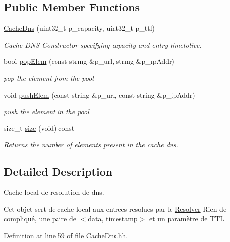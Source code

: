 \subsection*{Public Member Functions}
\begin{DoxyCompactItemize}
\item 
\hyperlink{classxtd_1_1network_1_1utils_1_1CacheDns_ac74635760f1d9fb738d940e3dc723476}{Cache\-Dns} (uint32\-\_\-t p\-\_\-capacity, uint32\-\_\-t p\-\_\-ttl)
\begin{DoxyCompactList}\small\item\em Cache D\-N\-S Constructor specifying capacity and entry timetolive. \end{DoxyCompactList}\item 
bool \hyperlink{classxtd_1_1network_1_1utils_1_1CacheDns_ab409d08cb0159d6250db8d1d05c6617b}{pop\-Elem} (const string \&p\-\_\-url, string \&p\-\_\-ip\-Addr)
\begin{DoxyCompactList}\small\item\em pop the element from the pool \end{DoxyCompactList}\item 
void \hyperlink{classxtd_1_1network_1_1utils_1_1CacheDns_a1ac8401e5827dbfbc39a909c2cf7afdf}{push\-Elem} (const string \&p\-\_\-url, const string \&p\-\_\-ip\-Addr)
\begin{DoxyCompactList}\small\item\em push the element in the pool \end{DoxyCompactList}\item 
size\-\_\-t \hyperlink{classxtd_1_1network_1_1utils_1_1CacheDns_a05377d5ccc35a6ba0f6e7124c891be37}{size} (void) const 
\begin{DoxyCompactList}\small\item\em Returns the number of elements present in the cache dns. \end{DoxyCompactList}\end{DoxyCompactItemize}


\subsection{Detailed Description}
Cache local de resolution de dns. 

Cet objet sert de cache local aux entrees resolues par le \hyperlink{classxtd_1_1network_1_1utils_1_1Resolver}{Resolver} Rien de compliqué, une paire de $<$data, timestamp$>$ et un paramètre de T\-T\-L 

Definition at line 59 of file Cache\-Dns.\-hh.



